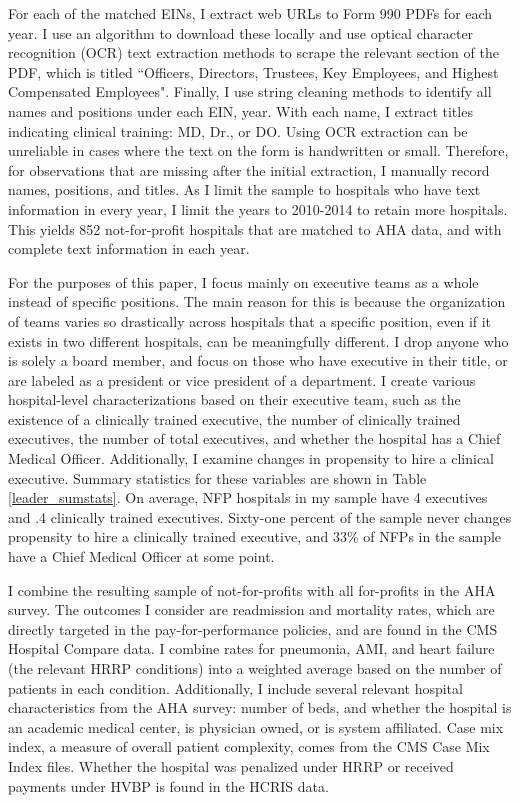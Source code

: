 \documentclass[12pt]{article}
\begin{document}
    For each of the matched EINs, I extract web URLs to Form 990 PDFs for each year. I use an algorithm to download these locally and use optical character recognition (OCR) text extraction methods to scrape the relevant section of the PDF, which is titled ``Officers, Directors, Trustees, Key Employees, and Highest Compensated Employees". Finally, I use string cleaning methods to identify all names and positions under each EIN, year. With each name, I extract titles indicating clinical training: MD, Dr., or DO. Using OCR extraction can be unreliable in cases where the text on the form is handwritten or small. Therefore, for observations that are missing after the initial extraction, I manually record names, positions, and titles. As I limit the sample to hospitals who have text information in every year, I limit the years to 2010-2014 to retain more hospitals. This yields 852 not-for-profit hospitals that are matched to AHA data, and with complete text information in each year. 

    For the purposes of this paper, I focus mainly on executive teams as a whole instead of specific positions. The main reason for this is because the organization of teams varies so drastically across hospitals that a specific position, even if it exists in two different hospitals, can be meaningfully different. I drop anyone who is solely a board member, and focus on those who have executive in their title, or are labeled as a president or vice president of a department. I create various hospital-level characterizations based on their executive team, such as the existence of a clinically trained executive, the number of clinically trained executives, the number of total executives, and whether the hospital has a Chief Medical Officer. Additionally, I examine changes in propensity to hire a clinical executive. Summary statistics for these variables are shown in Table \ref{leader_sumstats}. On average, NFP hospitals in my sample have 4 executives and .4 clinically trained executives. Sixty-one percent of the sample never changes propensity to hire a clinically trained executive, and 33\% of NFPs in the sample have a Chief Medical Officer at some point. 


    I combine the resulting sample of not-for-profits with all for-profits in the AHA survey. The outcomes I consider are readmission and mortality rates, which are directly targeted in the pay-for-performance policies, and are found in the CMS Hospital Compare data. I combine rates for pneumonia, AMI, and heart failure (the relevant HRRP conditions) into a weighted average based on the number of patients in each condition. Additionally, I include several relevant hospital characteristics from the AHA survey: number of beds, and whether the hospital is an academic medical center, is physician owned, or is system affiliated. Case mix index, a measure of overall patient complexity, comes from the CMS Case Mix Index files. Whether the hospital was penalized under HRRP or received payments under HVBP is found in the HCRIS data. 
\end{document}
